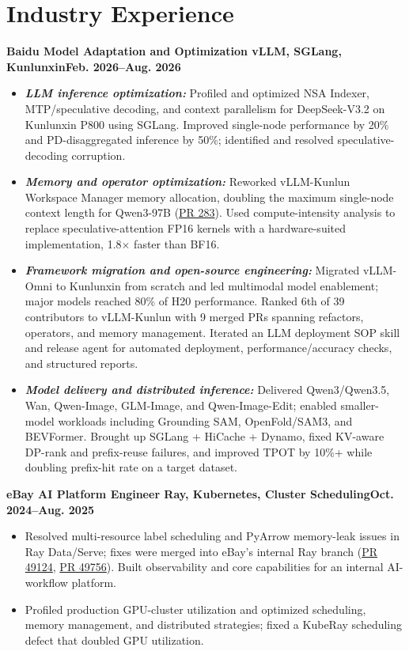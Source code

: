 \documentclass[10pt,a4paper]{article}
\newcommand{\dates}[1]{\hfill\textbf{#1}}
\newcommand{\role}[1]{{\bfseries\fontsize{11pt}{13pt}\selectfont #1}}
\newcommand{\project}[1]{{\bfseries\itshape #1}}
\begin{document}
\section*{Industry Experience}
\role{Baidu \textbar{} Model Adaptation and Optimization \textbar{} vLLM, SGLang, Kunlunxin}\dates{Feb. 2026--Aug. 2026}
\begin{itemize}
    \item \project{LLM inference optimization:} Profiled and optimized NSA Indexer, MTP/speculative decoding, and context parallelism for DeepSeek-V3.2 on Kunlunxin P800 using SGLang. Improved single-node performance by 20\% and PD-disaggregated inference by 50\%; identified and resolved speculative-decoding corruption.
    \item \project{Memory and operator optimization:} Reworked vLLM-Kunlun Workspace Manager memory allocation, doubling the maximum single-node context length for Qwen3-97B (\href{https://github.com/baidu/vLLM-Kunlun/pull/283/changes}{PR 283}). Used compute-intensity analysis to replace speculative-attention FP16 kernels with a hardware-suited implementation, 1.8$\times$ faster than BF16.
    \item \project{Framework migration and open-source engineering:} Migrated vLLM-Omni to Kunlunxin from scratch and led multimodal model enablement; major models reached 80\% of H20 performance. Ranked 6th of 39 contributors to vLLM-Kunlun with 9 merged PRs spanning refactors, operators, and memory management. Iterated an LLM deployment SOP skill and release agent for automated deployment, performance/accuracy checks, and structured reports.
    \item \project{Model delivery and distributed inference:} Delivered Qwen3/Qwen3.5, Wan, Qwen-Image, GLM-Image, and Qwen-Image-Edit; enabled smaller-model workloads including Grounding SAM, OpenFold/SAM3, and BEVFormer. Brought up SGLang + HiCache + Dynamo, fixed KV-aware DP-rank and prefix-reuse failures, and improved TPOT by 10\%+ while doubling prefix-hit rate on a target dataset.
\end{itemize}

\role{eBay \textbar{} AI Platform Engineer \textbar{} Ray, Kubernetes, Cluster Scheduling}\dates{Oct. 2024--Aug. 2025}
\begin{itemize}
    \item Resolved multi-resource label scheduling and PyArrow memory-leak issues in Ray Data/Serve; fixes were merged into eBay's internal Ray branch (\href{https://github.com/ray-project/ray/pull/49124}{PR 49124}, \href{https://github.com/ray-project/ray/pull/49756}{PR 49756}). Built observability and core capabilities for an internal AI-workflow platform.
    \item Profiled production GPU-cluster utilization and optimized scheduling, memory management, and distributed strategies; fixed a KubeRay scheduling defect that doubled GPU utilization.
\end{itemize}
\end{document}
